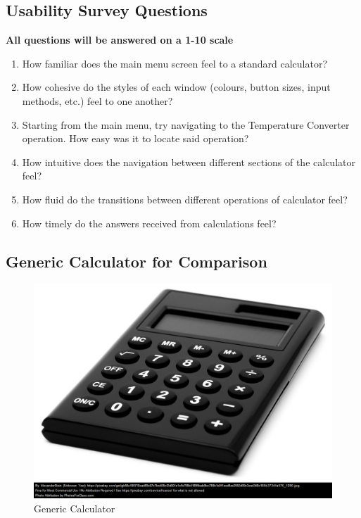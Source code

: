 \documentclass[12pt, titlepage]{article}
\begin{document}
\subsection{Usability Survey Questions}
\label{sec:survey}

\textbf{All questions will be answered on a 1-10 scale}

\begin{enumerate}

\item How familiar does the main menu screen feel to a standard calculator?
    
\item How cohesive do the styles of each window (colours, button sizes, input methods, etc.) feel to one another?

\item Starting from the main menu, try navigating to the Temperature Converter operation. How easy was it to locate said operation?

\item How intuitive does the navigation between different sections of the calculator feel?

\item How fluid do the transitions between different operations of calculator feel?

\item How timely do the answers received from calculations feel? 

\end{enumerate}


\subsection{Generic Calculator for Comparison}

\begin{figure}[H]
    \centering
    \includegraphics[scale=0.4]{Calc.png}
    \caption{Generic Calculator}
    \label{calc}
\end{figure}




\end{document}
